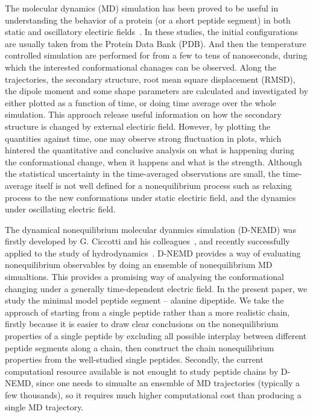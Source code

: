 \documentclass[aip,jcp,a4paper,preprint,onecolumn]{revtex4-1}
\begin{document}
The molecular dynamics (MD) simulation has been proved to be useful in
understanding the behavior of a protein (or a short peptide segment)
in both static and oscillatory electiric
fields~\cite{budi2005electric, budi2007effect, budi2008comparative,
  toschi2008effects, astrakas2011electric, astrakas2012structural,
  damm2012can, starzyk2013proteins, english2009nonequilibrium,
  solomentsev2012effects}. In these studies, the initial
configurations are usually taken from the Protein Data Bank (PDB).
And then the temperature controlled simulation are performed for from
a few to tens of nanoseconds, during which the interested
conformational chanages can be observed. Along the trajectories, the
secondary structure, root mean square displacement (RMSD), the dipole
moment and some shape parameters are calculated and investigated by
either plotted as a function of time, or doing time average over the
whole simulation. This approach release useful information on how the
secondary structure is changed by external electiric field.  However,
by plotting the quantities against time, one may observe strong
fluctuation in plots, which hintered the quantitative and conclusive
analysis on what is happening during the conformational change, when
it happens and what is the strength. Although the statistical
uncertainty in the time-averaged observations are small, the
time-average itself is not well defined for a nonequilibrium process
such as relaxing process to the new conformations under static
electiric field, and the dynamics under oscillating electric field.

The dynamical nonequilibrium molecular dyanmics simulation (D-NEMD)
was firstly developed by G. Ciccotti and his
colleagues~\cite{ciccotti1975direct, ciccotti1979thought}, and
recently successfully applied to the study of
hydrodynamics~\cite{orlandini2011hydrodynamics,
  orlandini2011hydrodynamics-01}. D-NEMD provides a way of evaluating
nonequilibrium observables by doing an ensemble of nonequilibrium MD
simualtions.  This provides a promising way of analysing the
conformational changing under a generally time-dependent electric
field. In the present paper, we study the minimal model peptide
segment -- alanine dipeptide. We take the approach of starting from a
single peptide rather than a more realistic chain, firstly because it
is easier to draw clear conclusions on the nonequilibrium properties
of a single peptide by excluding all possible interplay between
different peptide segments along a chain, then construct the chain
nonequilibrium properties from the well-studied single peptides.
Secondly, the current computationl resource available is not enought
to study peptide chains by D-NEMD, since one needs to simualte an
ensemble of MD trajectories (typically a few thousands), so it
requires much higher computational cost than producing a single MD
trajectory.
\end{document}
